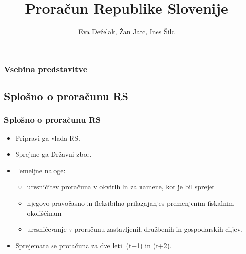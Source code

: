 \documentclass[10pt]{beamer}
\begin{document}
\title[Proračun Republike Slovenije]{Proračun Republike Slovenije}
\author{Eva Deželak, Žan Jarc, Ines Šilc}


\begin{frame}
	\titlepage
\end {frame}

\begin{frame}
	\frametitle{Vsebina predstavitve}
	\tableofcontents
\end {frame}

\begin{frame}
\section[Splošno o proračunu RS]{Splošno o proračunu RS}
\frametitle{Splošno o proračunu RS}
\begin{itemize}
\item Pripravi ga vlada RS.
\item Sprejme ga Državni zbor.
\item Temeljne naloge: 
\begin{itemize}
\item uresničitev proračuna v okvirih in za namene, kot je bil sprejet
\item njegovo pravočasno in fleksibilno prilagajanjes premenjenim fiskalnim okoliščinam
\item uresničevanje v proračunu zastavljenih družbenih in gospodarskih ciljev.
\end{itemize}
\item Sprejemata se proračuna za dve leti, (t+1) in (t+2).
\end{itemize}
\end{frame}
\end{document}
